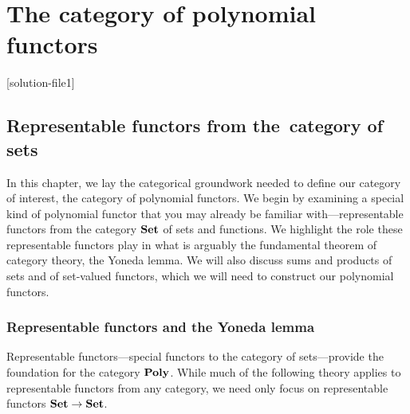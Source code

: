 \documentclass[Book-Poly]{subfiles}
\begin{document}
\setcounter{chapter}{0}%

\part{The category of polynomial functors}\label{part.poly}


[solution-file1]

\chapter{Representable functors from the~category of sets} \label{ch.poly.rep-sets}

In this chapter, we lay the categorical groundwork needed to define our category of interest, the category of polynomial functors.
We begin by examining a special kind of polynomial functor that you may already be familiar with---representable functors from the category $\mathbf{Set}$ of sets and functions.%
We highlight the role these representable functors play in what is arguably the fundamental theorem of category theory, the Yoneda lemma.
We will also discuss sums and products of sets and of set-valued functors, which we will need to construct our polynomial functors.

\section{Representable functors and the Yoneda lemma} \label{sec.poly.rep-sets.yon}


Representable functors---special functors to the category of sets---provide the foundation for the category $\mathbf{Poly}$.
While much of the following theory applies to representable functors from any category, we need only focus on representable functors $\mathbf{Set}\to\mathbf{Set}$.
\end{document}

